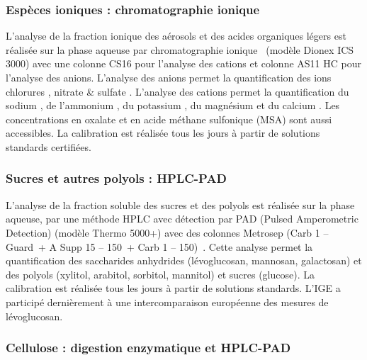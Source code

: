 \subsubsection{Espèces ioniques : chromatographie ionique}%
\label{ssub:espèces_ioniques_par_chromatographie}

L'analyse de la fraction ionique des aérosols et des acides organiques légers est réalisée
sur la phase aqueuse par chromatographie
ionique~\autocite{jaffrezoSeasonal2005,cenAmbient2017b} (modèle Dionex ICS 3000) avec une
colonne
CS16 pour l’analyse des cations et colonne AS11 HC pour l’analyse des anions. L’analyse
des anions permet la quantification des ions chlorures , nitrate  \&
sulfate . L’analyse des cations permet la quantification du sodium , de
l'ammonium , du potassium , du magnésium  et du calcium
. 
Les concentrations en oxalate et en acide méthane sulfonique (MSA) sont aussi accessibles.
La calibration est réalisée tous les jours à partir de solutions standards certifiées.

\subsubsection{Sucres et autres polyols : HPLC-PAD}%
\label{ssub:sucres_et_autres_polyols_hplc-pad}

L’analyse de la fraction soluble des sucres et des polyols est réalisée sur la phase
aqueuse, par une méthode HPLC avec détection par PAD (Pulsed Amperometric Detection)
(modèle Thermo 5000+) avec des colonnes Metrosep (Carb 1 – Guard + A Supp 15 – 150 + Carb
1 – 150)~\autocite{piotQuantification2012,wakedSource2014}.
Cette analyse permet la quantification des saccharides anhydrides (lévoglucosan,
mannosan, galactosan) et des polyols (xylitol, arabitol, sorbitol, mannitol) et sucres
(glucose). La calibration est réalisée tous les jours à partir de solutions standards.
L’IGE a participé dernièrement à une intercomparaison européenne des mesures de
lévoglucosan.

\subsubsection{Cellulose : digestion enzymatique et HPLC-PAD}%
\label{ssub:cellulose_}

